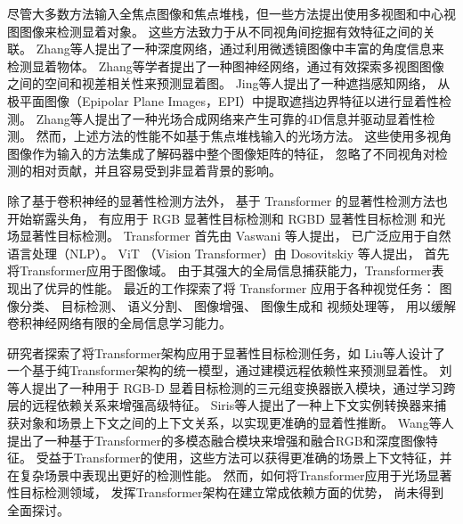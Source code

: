 尽管大多数方法输入全焦点图像和焦点堆栈，但一些方法提出使用多视图和中心视图图像来检测显着对象。 
这些方法致力于从不同视角间挖掘有效特征之间的关联。
Zhang等人提出了一种深度网络，通过利用微透镜图像中丰富的角度信息来检测显着物体。 
Zhang等学者提出了一种图神经网络，通过有效探索多视图图像之间的空间和视差相关性来预测显着图。 
Jing等人提出了一种遮挡感知网络，
从极平面图像（Epipolar Plane Images，EPI）中提取遮挡边界特征以进行显着性检测。 
Zhang等人提出了一种光场合成网络来产生可靠的4D信息并驱动显着性检测。 
然而，上述方法的性能不如基于焦点堆栈输入的光场方法。 
这些使用多视角图像作为输入的方法集成了解码器中整个图像矩阵的特征，
忽略了不同视角对检测的相对贡献，并且容易受到非显着背景的影响。 




除了基于卷积神经的显著性检测方法外，
基于 Transformer 的显著性检测方法也开始崭露头角，
有应用于 
RGB 显著性目标检测和 
RGBD 显著性目标检测
和光场显著性目标检测。
Transformer 首先由 Vaswani 等人提出，
已广泛应用于自然语言处理（NLP）。
ViT （Vision Transformer）由 Dosovitskiy 等人提出，
首先将Transformer应用于图像域。
由于其强大的全局信息捕获能力，Transformer表现出了优异的性能。
最近的工作探索了将 Transformer 应用于各种视觉任务：
图像分类、
目标检测、
语义分割、
图像增强、
图像生成和 
视频处理等，
用以缓解卷积神经网络有限的全局信息学习能力。



研究者探索了将Transformer架构应用于显著性目标检测任务，如
Liu等人设计了一个基于纯Transformer架构的统一模型，通过建模远程依赖性来预测显着性。
刘等人提出了一种用于 RGB-D 显着目标检测的三元组变换器嵌入模块，通过学习跨层的远程依赖关系来增强高级特征。 
Siris等人提出了一种上下文实例转换器来捕获对象和场景上下文之间的上下文关系，以实现更准确的显着性推断。 
Wang等人提出了一种基于Transformer的多模态融合模块来增强和融合RGB和深度图像特征。
受益于Transformer的使用，这些方法可以获得更准确的场景上下文特征，并在复杂场景中表现出更好的检测性能。 然而，如何将Transformer应用于光场显著性目标检测领域，
发挥Transformer架构在建立常成依赖方面的优势，
尚未得到全面探讨。 






